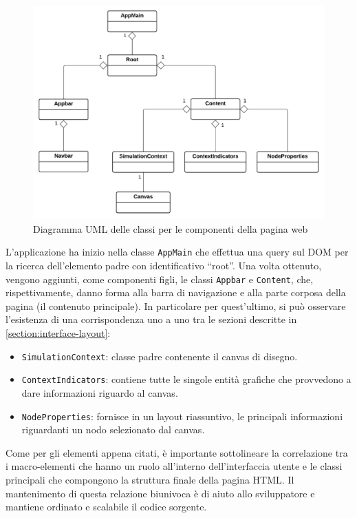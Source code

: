 \begin{figure}[htb]
	\centering
	\includegraphics[scale=0.82]{imgs/Struttura pagina web.pdf}
	\caption{Diagramma UML delle classi per le componenti della pagina web}
	\label{fig:page-structure}
\end{figure}

L'applicazione ha inizio nella classe \texttt{AppMain} che effettua una query sul \ac{DOM} per la ricerca dell'elemento padre con identificativo ``root''. Una volta ottenuto, vengono aggiunti, come componenti figli, le classi \texttt{Appbar} e \texttt{Content}, che, rispettivamente, danno forma alla barra di navigazione e alla parte corposa della pagina (il contenuto principale). In particolare per quest'ultimo, si può osservare l'esistenza di una corrispondenza uno a uno tra le sezioni descritte in \cref{section:interface-layout}: 
\begin{itemize}
	\item \texttt{SimulationContext}: classe padre contenente il canvas di disegno.
	\item \texttt{ContextIndicators}: contiene tutte le singole entità grafiche che provvedono a dare informazioni riguardo al canvas.
	\item \texttt{NodeProperties}: fornisce in un layout riassuntivo, le principali informazioni riguardanti un nodo selezionato dal canvas.
\end{itemize}
Come per gli elementi appena citati, è importante sottolineare la correlazione tra i macro-elementi che hanno un ruolo all'interno dell'interfaccia utente e le classi principali che compongono la struttura finale della pagina HTML. Il mantenimento di questa relazione biunivoca è di aiuto allo sviluppatore e mantiene ordinato e scalabile il codice sorgente.


